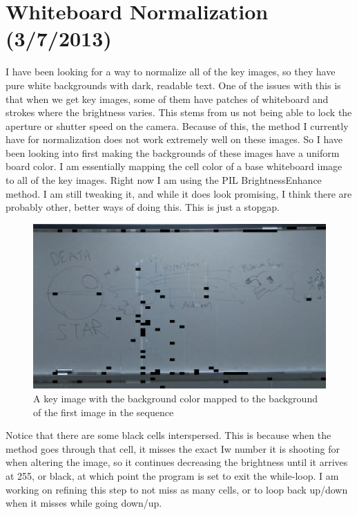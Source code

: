 \documentclass[]{article}
\begin{document}
	\section{Whiteboard Normalization (3/7/2013)}	
		I have been looking for a way to normalize all of the key images, so they have pure white backgrounds with dark, readable text.  One of the issues with this is that when we get key images, some of them have patches of whiteboard and strokes where the brightness varies.  This stems from us not being able to lock the aperture or shutter speed on the camera.  Because of this, the method I currently have for normalization does not work extremely well on these images.  So I have been looking into first making the backgrounds of these images have a uniform board color.  I am essentially mapping the cell color of a base whiteboard image to all of the key images.  Right now I am using the PIL BrightnessEnhance method.  I am still tweaking it, and while it does look promising, I think there are probably other, better ways of doing this.  This is just a stopgap.  

\begin{figure}[H]
\centering
\includegraphics[scale=0.2]{images/keyimg_unigray}
\caption{A key image with the background color mapped to the background of the first image in the sequence}
\end{figure}	
		
Notice that there are some black cells interspersed.  This is because when the method goes through that cell, it misses the exact Iw number it is shooting for when altering the image, so it continues decreasing the brightness until it arrives at 255, or black, at which point the program is set to exit the while-loop.  I am working on refining this step to not miss as many cells, or to loop back up/down when it misses while going down/up.	
	
\end{document}
